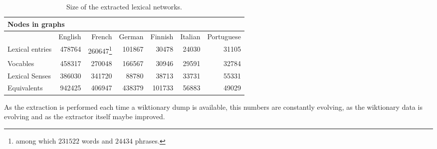 \documentclass[10pt, a4paper]{article}
\begin{document}
\begin{table}[htb]
\begin{minipage}{\linewidth}
\begin{tabular}{lrrrrrr}
\multicolumn{4}{l}{\textbf{Nodes in graphs}}\\
\hline
				 & English &  French  & German & Finnish & Italian & Portuguese \\
Lexical entries &  478764 &  260647\footnote{among which $231522$ words and $24434$ phrases.}  
				 					   & 101867  &  30478 & 24030   & 31105         \\
Vocables 	     & 458317  & 270048  & 166567   & 30946 & 29591  &  32784    \\
Lexical Senses
			     & 386030  & 341720  & 88780   & 38713   &  33731  & 55331      \\
Equivalents
			     & 942425  & 406947 & 438379  & 101733 & 56883   & 49029       \\
\end{tabular}
\end{minipage}
\caption{Size of the extracted lexical networks.}
\label{table:size}
\end{table}

As the extraction is performed each time a wiktionary dump is available, this numbers are constantly evolving, as the wiktionary data is evolving and as the extractor itself maybe improved.
\end{document}
